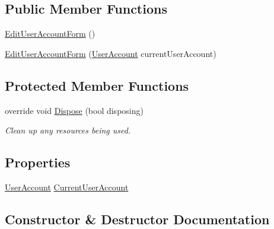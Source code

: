 \subsection*{Public Member Functions}
\begin{DoxyCompactItemize}
\item 
\hyperlink{class_health___assignment_1_1_edit_user_account_form_af790af144a06e1d7db80238605f18afc}{Edit\+User\+Account\+Form} ()
\item 
\hyperlink{class_health___assignment_1_1_edit_user_account_form_ab6bb470e8017b071ed78ed50fd72e3f0}{Edit\+User\+Account\+Form} (\hyperlink{class_health___assignment_1_1_user_account}{User\+Account} current\+User\+Account)
\end{DoxyCompactItemize}
\subsection*{Protected Member Functions}
\begin{DoxyCompactItemize}
\item 
override void \hyperlink{class_health___assignment_1_1_edit_user_account_form_a6d8ed32fb2da8afcd389cfdb84557bf5}{Dispose} (bool disposing)
\begin{DoxyCompactList}\small\item\em Clean up any resources being used. \end{DoxyCompactList}\end{DoxyCompactItemize}
\subsection*{Properties}
\begin{DoxyCompactItemize}
\item 
\hyperlink{class_health___assignment_1_1_user_account}{User\+Account} \hyperlink{class_health___assignment_1_1_edit_user_account_form_acadb95235997f30847e6fc9accd2374d}{Current\+User\+Account}
\end{DoxyCompactItemize}


\subsection{Constructor \& Destructor Documentation}
\mbox{\label{class_health___assignment_1_1_edit_user_account_form_af790af144a06e1d7db80238605f18afc}} 
